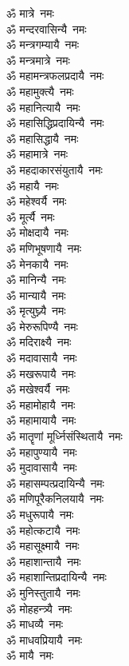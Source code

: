 \begin{flushleft}
\begin{multicols}{2}
ॐ मात्रे~नमः\\
ॐ मन्दरवासिन्यै~नमः\\
ॐ मन्त्रगम्यायै~नमः\\
ॐ मन्त्रमात्रे~नमः\\
ॐ महामन्त्रफलप्रदायै~नमः\\
ॐ महामुक्त्यै~नमः\\
ॐ महानित्यायै~नमः\\
ॐ महासिद्धिप्रदायिन्यै~नमः\\
ॐ महासिद्धायै~नमः\hfill{}\\
ॐ महामात्रे~नमः\\
ॐ महदाकारसंयुतायै~नमः\\
ॐ महायै~नमः\\
ॐ महेश्वर्यै~नमः\\
ॐ मूर्त्यै~नमः\\
ॐ मोक्षदायै~नमः\\
ॐ मणिभूषणायै~नमः\\
ॐ मेनकायै~नमः\\
ॐ मानिन्यै~नमः\\
ॐ मान्यायै~नमः\hfill{}\\
ॐ मृत्युघ्न्यै~नमः\\
ॐ मेरुरूपिण्यै~नमः\\
ॐ मदिराक्ष्यै~नमः\\
ॐ मदावासायै~नमः\\
ॐ मखरूपायै~नमः\\
ॐ मखेश्वर्यै~नमः\\
ॐ महामोहायै~नमः\\
ॐ महामायायै~नमः\\
ॐ मातॄणां मूर्ध्निसंस्थितायै~नमः\\
ॐ महापुण्यायै~नमः\hfill{}\\
ॐ मुदावासायै~नमः\\
ॐ महासम्पत्प्रदायिन्यै~नमः\\
ॐ मणिपूरैकनिलयायै~नमः\\
ॐ मधुरूपायै~नमः\\
ॐ महोत्कटायै~नमः\\
ॐ महासूक्ष्मायै~नमः\\
ॐ महाशान्तायै~नमः\\
ॐ महाशान्तिप्रदायिन्यै~नमः\\
ॐ मुनिस्तुतायै~नमः\\
ॐ मोहहन्त्र्यै~नमः\hfill{}\\
ॐ माधव्यै~नमः\\
ॐ माधवप्रियायै~नमः\\
ॐ मायै~नमः\\

\end{multicols}
\end{flushleft}
